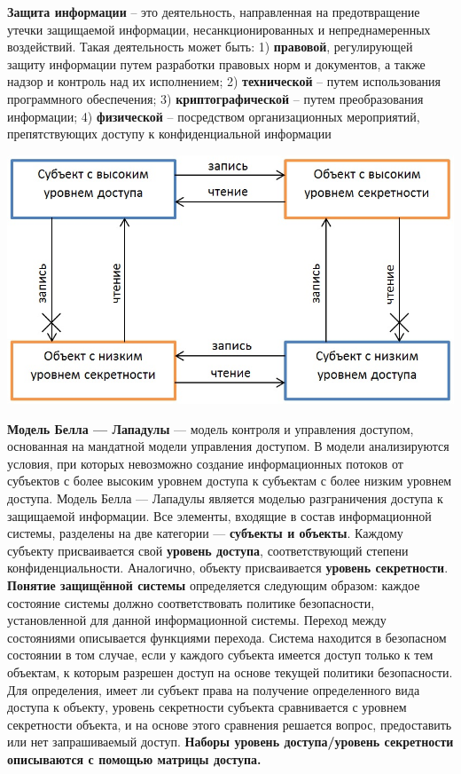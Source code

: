 \textbf{Защита информации} – это деятельность, направленная на предотвращение утечки защищаемой информации, несанкционированных и непреднамеренных воздействий. Такая деятельность может быть: 1) \textbf{правовой}, регулирующей защиту информации путем разработки правовых норм и документов, а также надзор и контроль над их исполнением; 2) \textbf{технической} – путем использования программного обеспечения; 3) \textbf{криптографической} – путем преобразования информации; 4) \textbf{физической} – посредством организационных мероприятий, препятствующих доступу к конфиденциальной информации

\includegraphics[scale=0.4]{pics/bella.png}

\textbf{Модель Белла — Лападулы} — модель контроля и управления доступом, основанная на мандатной модели управления доступом. В модели анализируются условия, при которых невозможно создание информационных потоков от субъектов с более высоким уровнем доступа к субъектам с более низким уровнем доступа. Модель Белла — Лападулы является моделью разграничения доступа к защищаемой информации. Все элементы, входящие в состав информационной системы, разделены на две категории — \textbf{субъекты и объекты}. Каждому субъекту присваивается свой \textbf{уровень доступа}, соответствующий степени конфиденциальности. Аналогично, объекту присваивается \textbf{уровень секретности}. \textbf{Понятие защищённой системы} определяется следующим образом: каждое состояние системы должно соответствовать политике безопасности, установленной для данной информационной системы. Переход между состояниями описывается функциями перехода. Система находится в безопасном состоянии в том случае, если у каждого субъекта имеется доступ только к тем объектам, к которым разрешен доступ на основе текущей политики безопасности. Для определения, имеет ли субъект права на получение определенного вида доступа к объекту, уровень секретности субъекта сравнивается с уровнем секретности объекта, и на основе этого сравнения решается вопрос, предоставить или нет запрашиваемый доступ. \textbf{Наборы уровень доступа/уровень секретности описываются с помощью матрицы доступа.}


